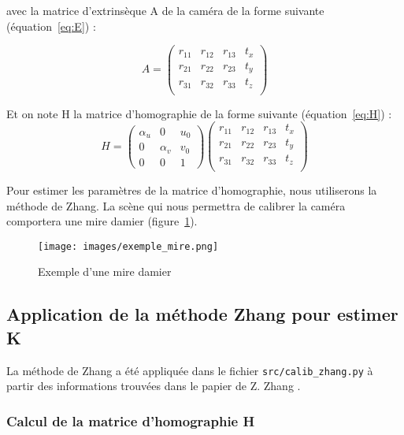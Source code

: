 \documentclass[12pt]{article}
\begin{document}
avec la matrice d'extrinsèque A de la caméra de la forme suivante (équation~\ref{eq:E}) :

\begin{equation}
    A = 
\begin{pmatrix}
r_{11} & r_{12} & r_{13} & t_x \\
r_{21} & r_{22} & r_{23} & t_y \\
r_{31} & r_{32} & r_{33} & t_z \\
\end{pmatrix}
\label{eq:E}
\end{equation}

Et on note H la matrice d'homographie de la forme suivante (équation~\ref{eq:H}) :
\begin{equation}
    H =
\begin{pmatrix}
\alpha_{u} & 0 & u_0 \\
0 & \alpha_{v} & v_0 \\
0 & 0 & 1
\end{pmatrix}
\begin{pmatrix}
r_{11} & r_{12} & r_{13} & t_x \\
r_{21} & r_{22} & r_{23} & t_y \\
r_{31} & r_{32} & r_{33} & t_z \\
\end{pmatrix}
\label{eq:H}
\end{equation}

Pour estimer les paramètres de la matrice d'homographie, nous utiliserons la méthode de Zhang.
La scène qui nous permettra de calibrer la caméra comportera une mire damier (figure~\ref{fig:chessboard}).

\begin{figure}[H]
\centering
\texttt{[image: images/exemple\_mire.png]}
\caption{Exemple d'une mire damier}
\label{fig:chessboard}
\end{figure}

\subsection{Application de la méthode Zhang pour estimer K}

La méthode de Zhang a été appliquée dans le fichier \texttt{src/calib\_zhang.py} à partir des informations trouvées dans le papier de Z. Zhang \cite{zhang_paper}.

\subsubsection{Calcul de la matrice d'homographie H}
\end{document}
